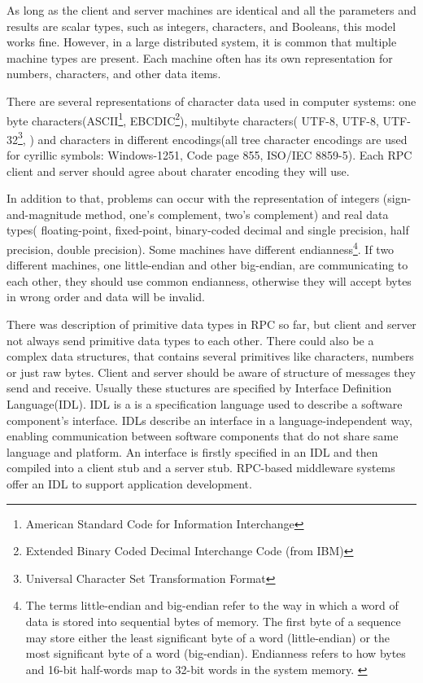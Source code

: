 As long as the client and server machines are identical and all the parameters
and results are scalar types, such as integers, characters, and Booleans, this model
works fine. 
However, in a large distributed system, it is common that multiple
machine types are present.
Each machine often has its own representation for
numbers, characters, and other data items\cite{tanenbaum07}.

There are several representations of character data used in computer systems:
one byte characters(ASCII\footnote{ American Standard Code for Information
Interchange}, EBCDIC\footnote{Extended Binary Coded Decimal Interchange Code
(from IBM)}), multibyte characters( UTF-8, UTF-8, UTF-32\footnote{Universal
Character Set Transformation Format},  ) and characters in different
encodings(all tree character encodings are used for cyrillic symbols: 
Windows-1251, Code page 855, ISO/IEC 8859-5). Each RPC client and server should
agree about charater encoding they will use.

In addition to that, problems can occur with the representation of integers
(sign-and-magnitude method, one’s complement, two’s complement) and
real data types( floating-point, fixed-point, binary-coded decimal and single
precision, half precision, double precision). Some machines have different
endianness\footnote{The terms little-endian and big-endian refer to the way in which a word of data is stored into sequential bytes of
memory. The first byte of a sequence may store either the least significant byte of a word (little-endian) or the most
significant byte of a word (big-endian). Endianness refers to how bytes and
16-bit half-words map to 32-bit words in the system memory. \cite{arm_endian}}.
If two different machines, one little-endian and other big-endian, are
communicating to each other, they should use common endianness, otherwise they
will accept bytes in wrong order and data will be invalid.

There was description of primitive data types in RPC so far, but client and
server not always send primitive data types to each other. There could also be a
complex data structures, that contains several primitives like characters,
numbers or just raw bytes. Client and server should be aware of structure of
messages they send and receive. Usually these stuctures are specified by
Interface Definition Language(IDL).
IDL is a  is a specification language used to describe a software component's interface.
IDLs describe an interface in a language-independent way, enabling
communication between software components that do not share same language and
platform.
An interface is firstly specified in an IDL and then compiled into a
client stub and a server stub. RPC-based middleware systems
offer an IDL to support application development\cite{tanenbaum07}.

